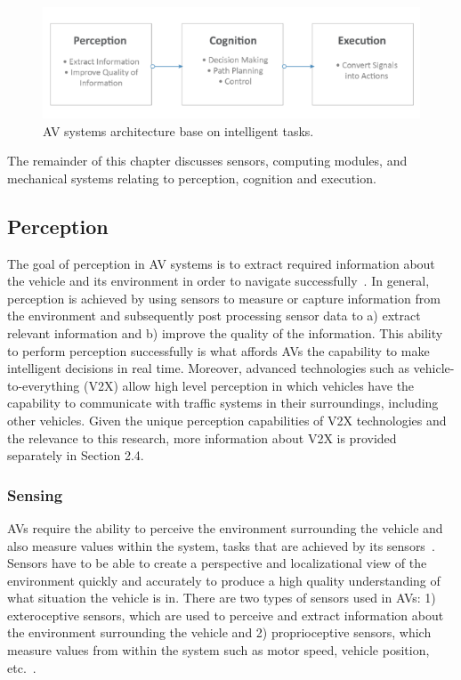 \documentclass{article}
\begin{document}
\begin{figure}[htbp]
\begin{center}
\includegraphics[scale=0.7]{figures/av_architecture.png}
\caption{AV systems architecture base on intelligent tasks.}
\label{fig:av_arch}
\end{center}
\end{figure}
	
	The remainder of this chapter discusses sensors, computing modules, and mechanical systems relating to perception, cognition and execution.

\subsection{Perception}

The goal of perception in AV systems is to extract required information about the vehicle and its environment in order to navigate successfully~\cite{Naoki2014}.  In general, perception is achieved by using sensors to measure or capture information from the environment and subsequently post processing sensor data to a) extract relevant information and b) improve the quality of the information. This ability to perform perception successfully is what affords AVs the capability to make intelligent decisions in real time. Moreover, advanced technologies such as vehicle-to-everything (V2X) allow high level perception in which vehicles have the capability to communicate with traffic systems in their surroundings, including other vehicles. Given the unique perception capabilities of V2X technologies and the relevance to this research, more information about V2X is provided separately in Section 2.4.

\subsubsection{Sensing}

AVs require the ability to perceive the environment surrounding the vehicle and also measure values within the system, tasks that are achieved by  its sensors~\cite{Naoki2014}. Sensors have to be able to create a perspective and localizational view of the environment quickly and accurately to produce a high quality understanding of what situation the vehicle is in. There are two types of sensors used in AVs: 1) exteroceptive sensors, which are used to perceive and extract information about the environment surrounding the vehicle and 2) proprioceptive sensors, which measure values from within the system such as motor speed, vehicle position, etc.~\cite{Campbell2018}.
\end{document}
